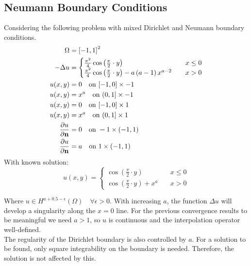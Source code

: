 \documentclass[11pt,a4paper]{article}
\begin{document}
\subsection*{Neumann Boundary Conditions}
Considering the following problem with mixed Dirichlet and Neumann boundary conditions.
\begin{equation}
  \begin{split}
    \Omega &= \left[-1,1\right]^2\\
    -\Delta u &= \begin{cases}
      \frac{\pi^2}{4} \operatorname{cos}\left(\frac{\pi}{2} \cdot y\right) \quad &x \le 0\\
      \frac{\pi^2}{4} \operatorname{cos}\left(\frac{\pi}{2} \cdot y\right) - a\left(a-1\right)x^{a-2} \quad &x > 0
    \end{cases}\\
    u(x,y) &= 0 \quad \text{on } [-1,0] \times -1\\
    u(x,y) &= x^a \quad \text{on } (0,1] \times -1\\
    u(x,y) &= 0 \quad \text{on } [-1,0] \times 1\\
    u(x,y) &= x^a \quad \text{on } (0,1] \times 1\\
    \frac{\partial u}{\partial {\bf n}} &= 0 \quad \text{on } -1 \times (-1,1)\\
    \frac{\partial u}{\partial {\bf n}} &= a \quad \text{on } 1 \times (-1,1)
  \end{split}
\end{equation}
With known solution:
\begin{equation*}
  u(x,y) = \begin{cases}
    \operatorname{cos}\left(\frac{\pi}{2} \cdot y\right) \quad &x \le 0\\
    \operatorname{cos}\left(\frac{\pi}{2} \cdot y\right) + x^a \quad &x > 0
  \end{cases}
\end{equation*}

Where $u \in H^{a+0.5 - \epsilon}(\Omega) \quad \forall \epsilon > 0$. With increasing $a$,
the function $\Delta u$ will develop a singularity along the $x = 0$ line. For the previous convergence
results to be meaningful we need $a > 1$, so $u$ is continuous and the interpolation operator
well-defined.\\
The regularity of the Dirichlet boundary is also controlled by $a$. For a solution to be found,
only square integrability on the boundary is needed. Therefore, the solution is not affected by this.
\end{document}
